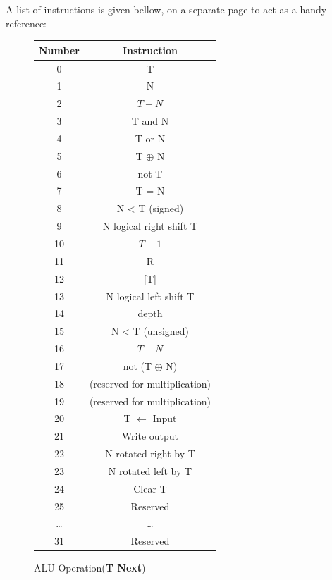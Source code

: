 \documentclass	[a4paper, 10pt]	{article}
\begin{document}
    A list of instructions is given bellow, on a separate page to act as a handy reference:
\FloatBarrier
\clearpage
\begin{figure}[ht]
\vspace{-2cm}
\hspace*{-2.5cm}
  \begin{minipage}[t]{0.45\linewidth}
    \small
    \centering

    \begin{tabular}{|c|c|}
      \hline
      \textbf{Number} & \textbf{Instruction}\\
      \hline
      0 & T\\
      \hline
      1 & N\\
      \hline
      2 & $T+N$\\
      \hline
      3 & T and N\\
      \hline
      4 & T or N\\
      \hline
      5 & T $\oplus$ N\\
      \hline
      6 & not T\\
      \hline
      7 & T = N\\
      \hline
      8 & N < T (signed)\\
      \hline
      9 & N logical right shift T\\
      \hline
      10 & $T-1$\\
      \hline
      11 & R\\
      \hline
      12 & [T]\\
      \hline
      13 & N logical left shift T\\
      \hline
      14 & depth\\
      \hline
      15 & N < T (unsigned)\\
      \hline
      16 & $T-N$\\
      \hline
      17 & not (T $\oplus$ N)\\
      \hline
      18 & (reserved for multiplication)\\
      \hline
      19 & (reserved for multiplication)\\
      \hline
      20 & T $\gets$ Input\\
      \hline
      21 & Write output\\
      \hline
      22 & N rotated right by T\\
      \hline
      23 & N rotated left by T\\
      \hline
      24 & Clear T\\
      \hline
      25 & Reserved\\
      \ldots & \ldots\\
      31 & Reserved\\
      \hline
    \end{tabular}
    \caption{ALU Operation(\textbf{T Next})}
    \label{fig:ALU instructions}
  \end{minipage}\hspace{0.5cm}
  \begin{minipage}[t]{0.45\linewidth}


\end{minipage}
\end{figure}
\end{document}
